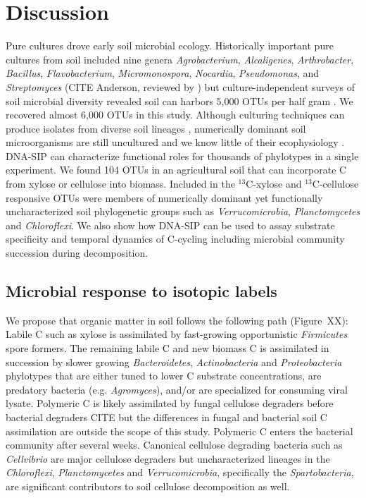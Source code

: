 \section{Discussion}
Pure cultures drove early soil microbial ecology. Historically important pure
cultures from soil included nine genera \textit{Agrobacterium},
\textit{Alcaligenes}, \textit{Arthrobacter}, \textit{Bacillus},
\textit{Flavobacterium}, \textit{Micromonospora}, \textit{Nocardia},
\textit{Pseudomonas}, and \textit{Streptomyces} (CITE Anderson, reviewed by
\citet{Janssen2006}) but culture-independent surveys of soil microbial
diversity revealed soil can harbors 5,000 OTUs per half gram
\citep{Schloss2006}. We recovered almost 6,000 OTUs in this study. Although
culturing techniques can produce isolates from diverse soil lineages
\citep{Janssen2002}, numerically dominant soil microorganisms are still
uncultured and we know little of their ecophysiology \citep{Janssen2006}.
DNA-SIP can characterize functional roles for thousands of phylotypes in
a single experiment. We found 104 OTUs in an agricultural soil that can
incorporate C from xylose or cellulose into biomass. Included in the
$^{13}$C-xylose and $^{13}$C-cellulose responsive OTUs were members of 
numerically dominant yet functionally uncharacterized soil phylogenetic groups
such as \textit{Verrucomicrobia}, \textit{Planctomycetes} and
\textit{Chloroflexi}. We also show how DNA-SIP can be used to assay substrate
specificity and temporal dynamics of C-cycling including microbial community
succession during decomposition.

\subsection{Microbial response to isotopic labels}
We propose that organic matter in soil follows the
following path (Figure~XX): Labile C such as xylose is assimilated by
fast-growing opportunistic \textit{Firmicutes} spore formers. The remaining
labile C and new biomass C is assimilated in succession by slower
growing \textit{Bacteroidetes}, \textit{Actinobacteria} and
\textit{Proteobacteria} phylotypes that are either tuned to lower C substrate
concentrations, are predatory bacteria (e.g. \textit{Agromyces}), and/or are
specialized for consuming viral lysate. Polymeric C is likely assimilated by
fungal cellulose degraders before bacterial degraders CITE but the differences
in fungal and bacterial soil C assimilation are outside the scope of this
study. Polymeric C enters the bacterial community after several weeks.
Canonical cellulose degrading bacteria such as \textit{Cellvibrio} are major
cellulose degraders but uncharacterized lineages in the \textit{Chloroflexi},
\textit{Planctomycetes} and \textit{Verrucomicrobia}, specifically the
\textit{Spartobacteria}, are significant contributors to soil cellulose
decomposition as well. 

